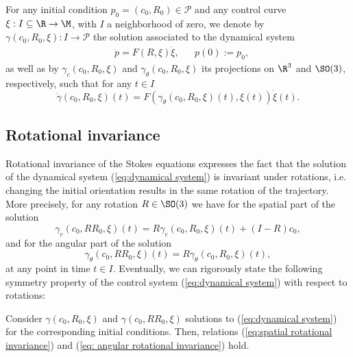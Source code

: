 \label{sec: symmetries}
For any initial condition $p_0 = (c_0, R_0) \in \mathcal{P}$ and any control curve $\xi: I \subseteq \R \to \M$, with $I$ a neighborhood of zero, we denote by $\gamma(c_0, R_0, \xi): I \to \mathcal{P}$ the solution associated to the dynamical system
\begin{equation}
\label{eq:dynamical system}
\begin{aligned}
	&\dot{p} = F(R, \xi) \dot{\xi},& & p(0) := p_0,
\end{aligned}
\end{equation}
as well as by $\gamma_c(c_0, R_0, \xi)$ and $\gamma_\theta(c_0, R_0, \xi)$ its projections on $\R^3$ and $\SO(3)$, respectively, such that for any $t \in I$
\begin{equation}
	\dot{\gamma}(c_0, R_0, \xi)(t) = F(\gamma_\theta(c_0, R_0, \xi)(t), \xi(t))\dot{\xi}(t).
\end{equation}

\subsection{Rotational invariance}
Rotational invariance of the Stokes equations expresses the fact that the solution of the dynamical system (\ref{eq:dynamical system}) is invariant under rotations, i.e. changing the initial orientation results in the same rotation of the trajectory. More precisely, for any rotation $R \in \SO(3)$ we have for the spatial part of the solution
\begin{equation}
\label{eq:spatial rotational invariance}
	\gamma_c(c_0, R R_0, \xi)(t) = R \gamma_c (c_0, R_0, \xi)(t) + (I - R) c_0,
\end{equation}
and for the angular part of the solution
\begin{equation}
\label{eq: angular rotational invariance}
	\gamma_\theta(c_0, R R_0, \xi)(t) =  R \gamma_\theta(c_0, R_0, \xi)(t),
\end{equation}
at any point in time $t \in I$. Eventually, we can rigorously state the following symmetry property of the control system (\ref{eq:dynamical system}) with respect to rotations:

\begin{condition}
\label{cond:rotational invariance}
Consider $\gamma(c_0, R_0, \xi)$ and $\gamma(c_0, R R_0, \xi)$ solutions to (\ref{eq:dynamical system}) for the corresponding initial conditions. Then, relations (\ref{eq:spatial rotational invariance}) and (\ref{eq: angular rotational invariance}) hold.
\end{condition}

